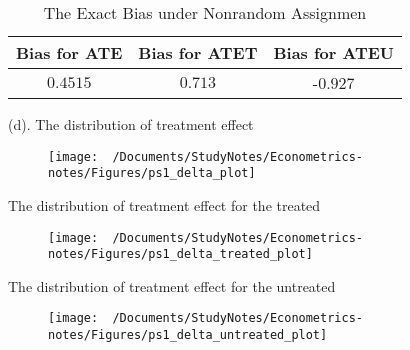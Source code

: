 \documentclass[11pt,a4paper]{amsart}
\theoremstyle{plain}
\theoremstyle{definition}
\begin{document}
\vspace{10pt}

\begin{table}[hb]
	\caption{\label{tb:exact_bias_nonrand} The Exact Bias under Nonrandom Assignmen}
	{
		\def\sym#1{\ifmmode^{#1}\else\(^{#1}\)\fi}
		\begin{tabular}{||c|c|c||}
	\hline
	Bias for ATE & Bias for ATET & Bias for  ATEU \\
	\hline
	$0.4515$ & $0.713$ & -$0.927$ \\
	\hline
\end{tabular} }
\end{table}

\vspace{5pt}

(d). The distribution of treatment effect
\begin{figure}[hbt]
{\centering \texttt{[image: ~/Documents/StudyNotes/Econometrics-notes/Figures/ps1\_delta\_plot]}}
\label{F:delta_all}
\end{figure}
\newpage
The distribution of treatment effect for the treated

\begin{figure}[hbt]
{\centering \texttt{[image: ~/Documents/StudyNotes/Econometrics-notes/Figures/ps1\_delta\_treated\_plot]}}
\label{F:delta_treated}
\end{figure}

The distribution of treatment effect for the untreated
\begin{figure}[hbt]
{\centering \texttt{[image: ~/Documents/StudyNotes/Econometrics-notes/Figures/ps1\_delta\_untreated\_plot]}}
\label{F:delta_untreated}
\end{figure}
\end{document}
